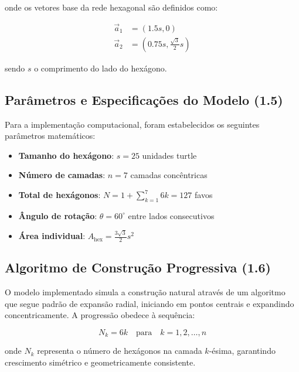 \documentclass[12pt,a4paper,oneside]{extarticle}
\begin{document}
onde os vetores base da rede hexagonal são definidos como:

\begin{align}
\vec{a}_1 &= \left(1.5s, 0\right) \\
\vec{a}_2 &= \left(0.75s, \frac{\sqrt{3}}{2}s\right)
\label{eq:base_vectors}
\end{align}

sendo $s$ o comprimento do lado do hexágono.

\subsection{Parâmetros e Especificações do Modelo (1.5)}
Para a implementação computacional, foram estabelecidos os seguintes parâmetros matemáticos:

\begin{itemize}
    \item \textbf{Tamanho do hexágono}: $s = 25$ unidades turtle
    \item \textbf{Número de camadas}: $n = 7$ camadas concêntricas
    \item \textbf{Total de hexágonos}: $N = 1 + \sum_{k=1}^{7} 6k = 127$ favos
    \item \textbf{Ângulo de rotação}: $\theta = 60^\circ$ entre lados consecutivos
    \item \textbf{Área individual}: $A_{\text{hex}} = \frac{3\sqrt{3}}{2}s^2$
\end{itemize}

\subsection{Algoritmo de Construção Progressiva (1.6)}
O modelo implementado simula a construção natural através de um algoritmo que segue padrão de expansão radial, iniciando em pontos centrais e expandindo concentricamente. A progressão obedece à sequência:

\begin{equation}
N_k = 6k \quad \text{para} \quad k = 1, 2, \ldots, n
\label{eq:progressive_growth}
\end{equation}

onde $N_k$ representa o número de hexágonos na camada $k$-ésima, garantindo crescimento simétrico e geometricamente consistente.
\end{document}
